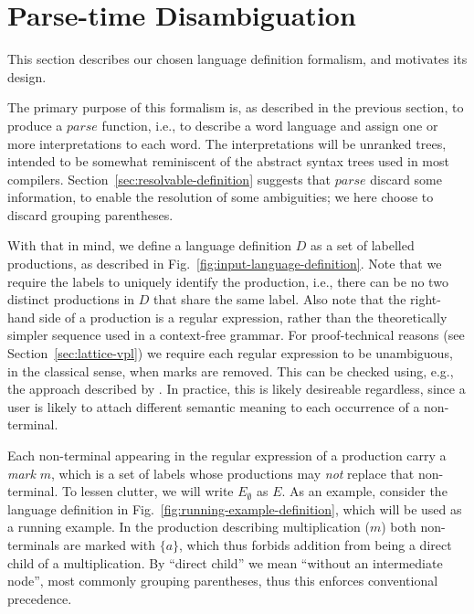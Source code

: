 \documentclass[acmsmall,review,anonymous]{acmart}\settopmatter{printfolios=true,printccs=false,printacmref=false}
\newcommand{\parse}{\mathit{parse}} %
\begin{document}
\section{Parse-time Disambiguation} \label{sec:parse-time-disambiguation}

This section describes our chosen language definition formalism, and motivates its design.

The primary purpose of this formalism is, as described in the previous section, to produce a $\parse$ function, i.e., to describe a word language and assign one or more interpretations to each word. The interpretations will be unranked trees, intended to be somewhat reminiscent of the abstract syntax trees used in most compilers. Section~\ref{sec:resolvable-definition} suggests that $\parse$ discard some information, to enable the resolution of some ambiguities; we here choose to discard grouping parentheses.

With that in mind, we define a language definition $D$ as a set of labelled productions, as described in Fig.~\ref{fig:input-language-definition}. Note that we require the labels to uniquely identify the production, i.e., there can be no two distinct productions in $D$ that share the same label. Also note that the right-hand side of a production is a regular expression, rather than the theoretically simpler sequence used in a context-free grammar. For proof-technical reasons (see Section~\ref{sec:lattice-vpl}) we require each regular expression to be unambiguous, in the classical sense, when marks are removed. This can be checked using, e.g., the approach described by \citet{brabrandTypedUnambiguousPattern2010}. In practice, this is likely desireable regardless, since a user is likely to attach different semantic meaning to each occurrence of a non-terminal.

Each non-terminal appearing in the regular expression of a production carry a \emph{mark} $m$, which is a set of labels whose productions may \emph{not} replace that non-terminal. To lessen clutter, we will write $E_\emptyset$ as $E$. As an example, consider the language definition in Fig.~\ref{fig:running-example-definition}, which will be used as a running example. In the production describing multiplication ($m$) both non-terminals are marked with $\{a\}$, which thus forbids addition from being a direct child of a multiplication. By ``direct child'' we mean ``without an intermediate node'', most commonly grouping parentheses, thus this enforces conventional precedence.
\end{document}

